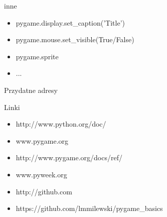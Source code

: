 \documentclass{beamer}
\begin{document}
\begin{frame}{inne}
  \begin{block}{}
    \begin{itemize}
    \item pygame.display.set\_caption('Title')
    \item pygame.mouse.set\_visible(True/False)
    \item pygame.sprite
    \item ...
    \end{itemize}
  \end{block}
\end{frame}

\begin{frame}{Przydatne adresy}
  \begin{block}{Linki}
    \begin{itemize}
    \item http://www.python.org/doc/
    \item www.pygame.org
    \item http://www.pygame.org/docs/ref/
    \item www.pyweek.org
    \item http://github.com
    \item https://github.com/lmmilewski/pygame\_basics
    \end{itemize}
  \end{block}

\end{frame}
\end{document}
